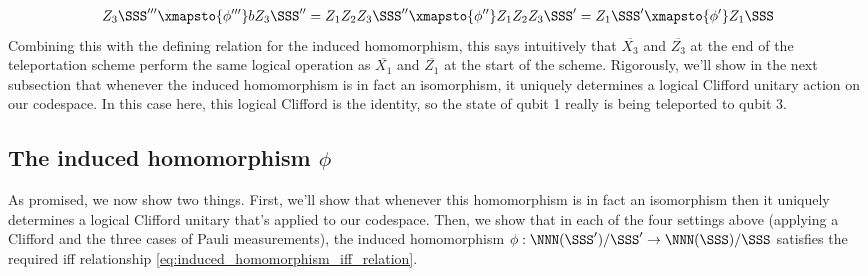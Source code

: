 \begin{example}
\begin{align}
        Z_3\SSS'''
        &\xmapsto{\phi'''} b Z_3\SSS'' = Z_1 Z_2 Z_3 \SSS''
        \xmapsto{\phi''} Z_1 Z_2 Z_3 \SSS' = Z_1 \SSS'
        \xmapsto{\phi'} Z_1\SSS \\
    \end{align}
    Combining this with the defining relation  for the induced homomorphism, this says intuitively that $\overline{X_3}$ and $\overline{Z_3}$ at the end of the teleportation scheme perform the same logical operation as $\overline{X_1}$ and $\overline{Z_1}$ at the start of the scheme.
    Rigorously, we'll show in the next subsection that whenever the induced homomorphism is in fact an isomorphism, it uniquely determines a logical Clifford unitary action on our codespace.
    In this case here, this logical Clifford is the identity, so the state of qubit 1 really is being teleported to qubit 3.
\end{example}

\subsection{The induced homomorphism $\phi$}\label{subsec:the-induced-homomorphism}

As promised, we now show two things.
First, we'll show that whenever this homomorphism is in fact an isomorphism then it uniquely determines a logical Clifford unitary that's applied to our codespace.
Then, we show that in each of the four settings above (applying a Clifford and the three cases of Pauli measurements), the induced homomorphism $\phi: \NNN(\SSS') / \SSS' \to \NNN(\SSS) / \SSS$ satisfies the required iff relationship \eqref{eq:induced_homomorphism_iff_relation}.

